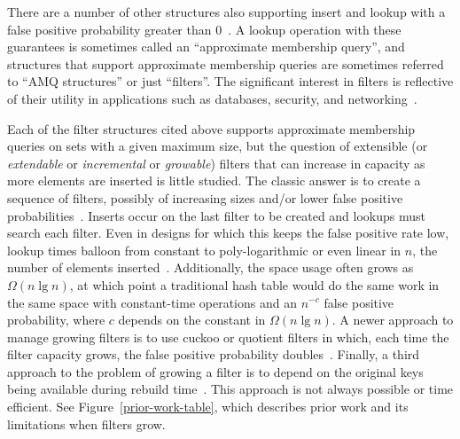 \documentclass[letterpaper,twocolumn,10pt]{article}
\begin{document}
There are a number of other structures also supporting insert and lookup with a false positive probability greater than 0~\cite{vacuum,morton-journal,ribbon,xor-filter,quotient-filter,broom,vector-quotient}.
A lookup operation with these guarantees is sometimes called an ``approximate membership query'', and structures that support approximate membership queries are sometimes referred to ``AMQ structures'' or just ``filters''.
The significant interest in filters is reflective of their utility in applications such as databases, security, and networking~\cite{split-bloom, vacuum, quotient-filter, malware, profile-similarity, invertible, flooding-filter, summary-cache, prefix-matching-filter}.


Each of the filter structures cited above supports approximate membership queries on sets with a given maximum size, but the question of extensible (or {\itshape extendable} or {\itshape incremental} or {\itshape growable}) filters that can increase in capacity as more elements are inserted is little studied.
The classic answer is to create a sequence of filters, possibly of increasing sizes and/or lower false positive probabilities~\cite{dynamic-bloom,scalable-bloom,dynamic-cuckoo}.
Inserts occur on the last filter to be created and lookups must search each filter.
Even in designs for which this keeps the false positive rate low, lookup times balloon from constant to poly-logarithmic or even linear in $n$, the number of elements inserted~\cite{psw,logarithm,consistent-cuckoo}. %
Additionally, the space usage often grows as $\Omega(n \lg n)$, at which point a traditional hash table would do the same work in the same space with constant-time operations and an $n^{-c}$ false positive probability, where $c$ depends on the constant in $\Omega(n \lg n)$.
A newer approach to manage growing filters is to use cuckoo or quotient filters in which, each time the filter capacity grows, the false positive probability doubles~\cite{logarithm,morton-journal,vacuum,rsqf,entry-extensible}.
Finally, a third approach to the problem of growing a filter is to depend on the original keys being available during rebuild time~\cite{elastic}.
This approach is not always possible or time efficient.
See Figure~\ref{prior-work-table}, which describes prior work and its limitations when filters grow.
\end{document}
